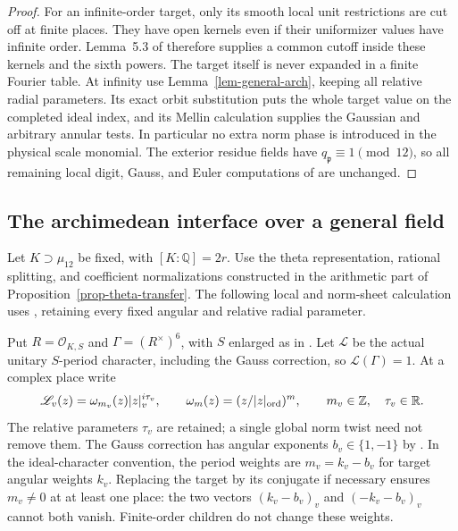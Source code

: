 \documentclass[11pt,a4paper]{article}
\theoremstyle{remark}\newtheorem{remark}[theorem]{Remark}
\numberwithin{equation}{section}
\begin{document}
\begin{proof}
For an infinite-order target, only its smooth local unit restrictions
are cut off at finite places.  They have open kernels even if their
uniformizer values have infinite order.  Lemma~5.3 of \cite{P}
therefore supplies a common cutoff inside these kernels and the
sixth powers.  The target itself is never expanded in a finite
Fourier table.  At infinity use Lemma~\ref{lem-general-arch}, keeping
all relative radial parameters.  Its exact orbit substitution puts
the whole target value on the completed ideal index, and its Mellin
calculation supplies the Gaussian and arbitrary annular tests.
In particular no extra norm phase is introduced in the physical
scale monomial.  The exterior residue fields have
$q_{\mathfrak p}\equiv1\pmod{12}$, so all remaining local digit,
Gauss, and Euler computations of \cite[Sections 6--7]{P} are unchanged.
\end{proof}


\subsection{The archimedean interface over a general field}
\label{subsec-general-arch}

Let $K\supset\mu_{12}$ be fixed, with $[K:\mathbb Q]=2r$.
Use the theta representation, rational splitting, and coefficient
normalizations constructed in the arithmetic part of
Proposition~\ref{prop-theta-transfer}.
The following local and norm-sheet calculation uses
\cite[Proposition 5.1 and Appendix A]{P}, retaining every fixed
angular and relative radial parameter.

Put $R=\mathcal O_{K,S}$ and $\Gamma=(R^\times)^6$, with $S$ enlarged
as in \cite[Section 3]{P}.  Let $\mathscr L$ be the actual unitary
$S$-period character, including the Gauss correction, so
$\mathscr L(\Gamma)=1$.  At a complex place write
\[
 \mathscr L_v(z)=\omega_{m_v}(z)|z|_v^{i\tau_v},\qquad
 \omega_m(z)=(z/|z|_{\rm ord})^m,
 \qquad m_v\in\mathbb Z,\quad\tau_v\in\mathbb R.
\]
The relative parameters $\tau_v$ are retained; a single global norm
twist need not remove them.  The Gauss correction has angular
exponents $b_v\in\{1,-1\}$ by \cite[Lemma 3.4]{P}.
In the ideal-character convention, the period weights are
$m_v=k_v-b_v$ for target angular weights $k_v$.
Replacing the target by its conjugate if necessary ensures
$m_v\ne0$ at at least one place: the two vectors
$(k_v-b_v)_v$ and $(-k_v-b_v)_v$ cannot both vanish.
Finite-order children do not change these weights.
\end{document}

